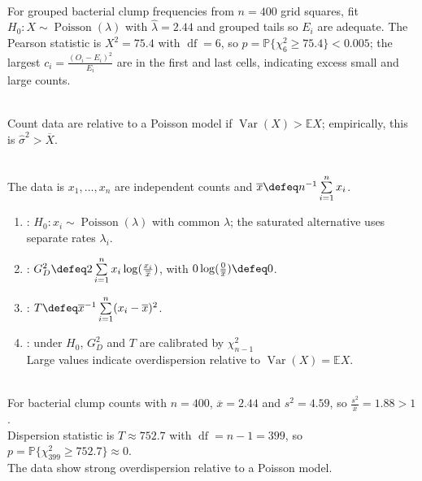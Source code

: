 \begin{example} \label{ex:poisson-clumps-goodness-of-fit} \\
For grouped bacterial clump frequencies from $n=400$ grid squares, fit $H_0:X\sim\operatorname{Poisson}(\lambda)$ with $\widehat{\lambda}=2.44$ and grouped tails so $E_i$ are adequate.
The Pearson statistic is $X^2=75.4$ with $\operatorname{df}=6$, so $p=\mathbb{P}\{\chi^2_6\geq75.4\}<0.005$; the largest $c_i=\frac{(O_i-E_i)^2}{E_i}$ are in the first and last cells, indicating excess small and large counts.
\end{example}

\begin{definition} \label{def:overdispersed-counts} \\
Count data are  relative to a Poisson model if $\operatorname{Var}(X)>\mathbb{E}X$; empirically, this is $\widehat{\sigma}^2>\overline{X}$.
\end{definition}

\begin{definition} \label{def:poisson-dispersion-test} \\
The data is $x_1,\ldots,x_n$ are independent counts and $\overline{x}\defeq n^{-1}\sum\limits_{i=1}^nx_i$.
\begin{enumerate}[label=(\roman*)]
\setlength{\itemsep}{0pt}
\item {}: $H_0:x_i\sim\operatorname{Poisson}(\lambda)$ with common $\lambda$; the saturated alternative uses separate rates $\lambda_i$.
\item {}: $G_D^2\defeq2\sum\limits_{i=1}^nx_i\log(\frac{x_i}{\overline{x}})$, with $0\log(\frac{0}{\overline{x}})\defeq0$.
\item {}: $T\defeq\overline{x}^{-1}\sum\limits_{i=1}^n(x_i-\overline{x})^2$.
\item {}: under $H_0$, $G_D^2$ and $T$ are calibrated by $\chi^2_{n-1}$\\
Large values indicate overdispersion relative to $\operatorname{Var}(X)=\mathbb{E}X$.
\end{enumerate}
\end{definition}

\begin{example} \label{ex:bacterial-clumps-dispersion} \\
For bacterial clump counts with $n=400$, $\overline{x}=2.44$ and $s^2=4.59$, so $\frac{s^2}{\overline{x}}=1.88>1$.\\
Dispersion statistic is $T\approx752.7$ with $\operatorname{df}=n-1=399$, so $p=\mathbb{P}\{\chi^2_{399}\geq752.7\}\approx0$.\\
The data show strong overdispersion relative to a Poisson model.
\end{example}

